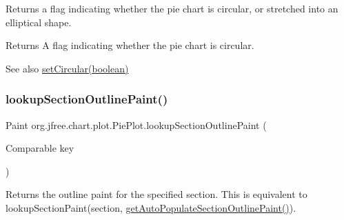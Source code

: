 Returns a flag indicating whether the pie chart is circular, or stretched into an elliptical shape.

\begin{DoxyReturn}{Returns}
A flag indicating whether the pie chart is circular.
\end{DoxyReturn}
\begin{DoxySeeAlso}{See also}
\mbox{\hyperlink{classorg_1_1jfree_1_1chart_1_1plot_1_1_pie_plot_ad604c65dd48135bbdfe7472dac9c5198}{set\+Circular(boolean)}} 
\end{DoxySeeAlso}
\mbox{\label{classorg_1_1jfree_1_1chart_1_1plot_1_1_pie_plot_a313892afd8de6bc0452c5c8c06d076fc}} 
\subsubsection{\texorpdfstring{lookup\+Section\+Outline\+Paint()}{lookupSectionOutlinePaint()}\hspace{0.1cm}{\footnotesize\ttfamily [1/2]}}
{\footnotesize\ttfamily Paint org.\+jfree.\+chart.\+plot.\+Pie\+Plot.\+lookup\+Section\+Outline\+Paint (\begin{DoxyParamCaption}\item[{Comparable}]{key }\end{DoxyParamCaption})\hspace{0.3cm}{\ttfamily [protected]}}

Returns the outline paint for the specified section. This is equivalent to {\ttfamily lookup\+Section\+Paint(section, \mbox{\hyperlink{classorg_1_1jfree_1_1chart_1_1plot_1_1_pie_plot_ad11b37f9c00a5465c12b2dab8570831f}{get\+Auto\+Populate\+Section\+Outline\+Paint()}})}.


